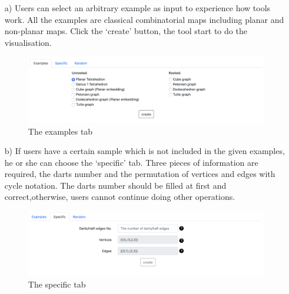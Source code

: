   \begin{itemize}
    \item[a)] Users can select an arbitrary example as input to experience how tools work. All the examples are classical combinatorial maps including planar and non-planar maps. Click the `create’ button, the tool start to do the visualisation.
    \begin{figure}[htb]
        \centering
        \includegraphics[width=1\textwidth]{../../image/exampletab.png}
        \caption{The examples tab}
        \label{fig:figures:exampletab}
      \end{figure}
    \newpage
    \item[b)] If users have a certain sample which is not included in the given examples, he or she can choose the  ‘specific’ tab. Three pieces of information are required, the darts number and the permutation of vertices and edges with cycle notation. The darts number should be filled at first and correct,otherwise, users cannot continue doing other operations.
    \begin{figure}[htb]
        \centering
        \includegraphics[width=1\textwidth]{../../image/specifictab.png}
        \caption{The specific tab}
        \label{fig:figures:specifictab}
      \end{figure}


\end{itemize}
